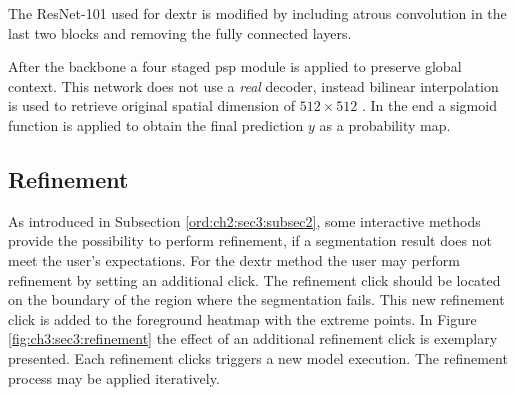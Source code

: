 The ResNet-101 used for \gls{dextr} is modified by including atrous convolution in the last two blocks and removing the fully connected layers.

After the backbone a four staged \gls{psp} module is applied to preserve global context.
This network does not use a \textit{real} decoder, instead bilinear interpolation is used to retrieve original spatial dimension of $512 \times 512$ .
In the end a sigmoid function is applied to obtain the final prediction $y$ as a  probability map.

\subsection{Refinement}\label{ord:ch3:sec3:subsec4}

As introduced in Subsection \ref{ord:ch2:sec3:subsec2}, some interactive methods provide the possibility to perform refinement, if a segmentation result does not meet the user's expectations.
For the \gls{dextr} method the user may perform refinement by setting an additional click.
The refinement click should be located on the boundary of the region where the segmentation fails.
This new refinement click is added to the foreground heatmap with the extreme points.
In Figure \ref{fig:ch3:sec3:refinement} the effect of an additional refinement click is exemplary presented.
Each refinement clicks triggers a new model execution.
The refinement process may be applied iteratively.

